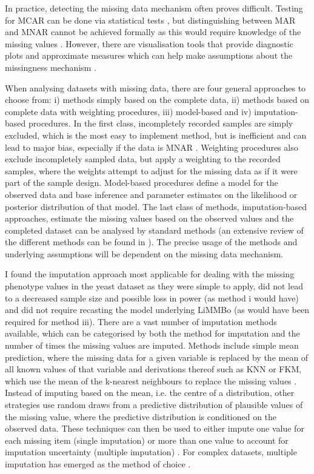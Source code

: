 In practice, detecting the missing data mechanism often proves difficult. Testing for MCAR can be done via statistical tests \citep{Little1988}, but distinguishing between MAR and MNAR cannot be achieved formally as this would require knowledge of the missing values \citep{Little2002,vanBuuren2011}. However, there are visualisation tools that provide diagnostic plots and approximate measures which can help make assumptions about the missingness mechanism \citep{Templ2012,Garson2015}. 

When analysing datasets with missing data, there are four general approaches to choose from:  i) methods simply based on the complete data, ii) methods based on complete data with weighting procedures, iii) model-based and iv) imputation-based procedures. In the first class, incompletely recorded samples are simply excluded, which is the most easy to implement method, but is inefficient and can lead to major bias, especially if the data is MNAR \citep{Little2002}. Weighting procedures also exclude incompletely sampled data, but apply a weighting to the recorded samples, where the weights attempt to adjust for the missing data as if it were part of the sample design. Model-based procedures define a model for the observed data and base inference and parameter estimates on the likelihood or posterior distribution of that model. The last class of methods, imputation-based approaches, estimate the missing values based on the observed values and the completed dataset can be analysed by standard methods (an extensive review of the different methods can be found in \citep{Little2002}). The precise usage of the methods and underlying assumptions will be dependent on the missing data mechanism. 

I found the imputation approach most applicable for dealing with the missing phenotype values in the yeast dataset as they were simple to apply, did not lead to a decreased sample size and possible loss in power (as method i would have) and did not require recasting the model underlying LiMMBo (as would have been required for method iii). There are a vast number of imputation methods available, which can be categorised by both the method for imputation and the number of times the missing values are imputed. Methods include simple mean prediction, where the missing data for a given variable is replaced by the mean of all known values of that variable and derivations thereof such as KNN or FKM, which use the mean of the k-nearest neighbours to replace the missing values \citep{Troyanskaya2001,Li2004}. Instead of imputing based on the mean, i.e. the centre of a distribution, other strategies use random draws from a predictive distribution of plausible values of the missing value, where the predictive distribution is conditioned on the observed data. These techniques can then be used to either impute one value for each missing item (single imputation) or more than one value to account for imputation uncertainty (multiple imputation) \citep{Little2002}. For complex datasets, multiple imputation has emerged as the method of choice \citep{Rubin1987,Schafer1997}. 

